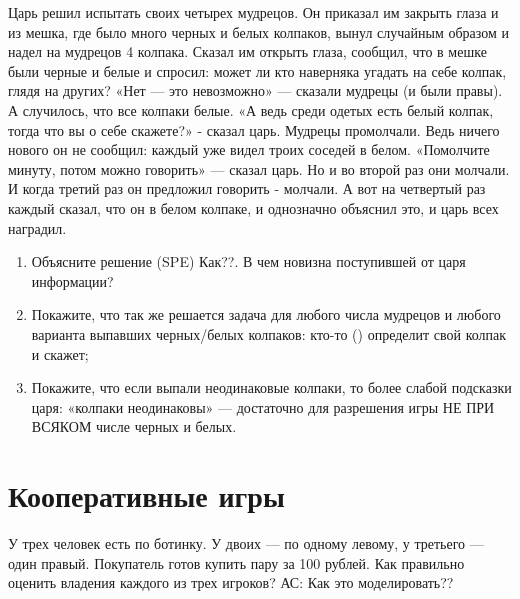 \begin{problem} [Колпаки]
\begin{source} \cite{myerson:gtac} \end{source}
 Царь решил испытать своих
четырех мудрецов. Он приказал им закрыть глаза и из мешка,
где было много черных и белых колпаков, вынул случайным
образом и надел на мудрецов 4 колпака. Сказал им открыть
глаза, сообщил, что в мешке были черные и белые и спросил:
может ли кто наверняка угадать на себе колпак, глядя на
других? «Нет — это невозможно» — сказали мудрецы (и были
правы). А случилось, что все колпаки белые. «А ведь среди
одетых есть белый колпак, тогда что вы о себе скажете?» -
сказал царь. Мудрецы промолчали. Ведь ничего нового он не
сообщил: каждый уже видел троих соседей в белом. «Помолчите
минуту, потом можно говорить» — сказал царь. Но и во второй
раз они молчали. И когда третий раз он предложил говорить -
молчали. А вот на четвертый раз каждый сказал, что он в
белом колпаке, и однозначно объяснил это, и царь всех
наградил.

\begin{enumerate}

\item Объясните решение (SPE) {\red Как??}. В чем новизна
поступившей от царя информации?

\item Покажите, что так же
решается задача для любого числа мудрецов и любого варианта
выпавших черных/белых колпаков: кто-то () определит свой
колпак и скажет;

\item Покажите, что если выпали неодинаковые
колпаки, то более слабой подсказки царя: «колпаки
неодинаковы» — достаточно для разрешения игры НЕ ПРИ ВСЯКОМ
числе черных и белых.
\end{enumerate}



\begin{sol}

\end{sol}
\end{problem}






\section{Кооперативные игры}

\begin{problem}[Ботинки]
У трех человек есть по ботинку. У двоих — по одному левому, у третьего — один правый. Покупатель готов купить пару за 100 рублей. Как правильно оценить владения каждого из трех игроков?
{\red АС: Как это моделировать??}



\begin{sol}

\end{sol}
\end{problem}



